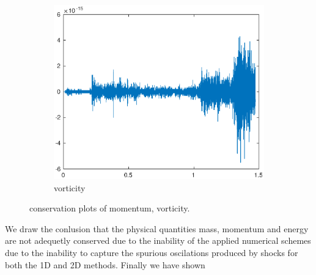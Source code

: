 \begin{figure}[h!]
\begin{subfigure}[b]{0.9\textwidth}
        \includegraphics[width=1.1\textwidth,height=0.52\textwidth]{images/cons_vort.eps}\hfill
        \caption{vorticity}
        \label{Momentum}
    \end{subfigure}
    \caption{conservation plots of momentum, vorticity.}
    \label{fig:2Dcons_B}
\end{figure}

We draw the conlusion that the physical quantities mass, momentum and energy are not adequetly conserved due to the inability of
the applied numerical schemes due to the inability to capture the spurious oscilations produced by shocks for both the 1D and 2D methods.
Finally we have shown